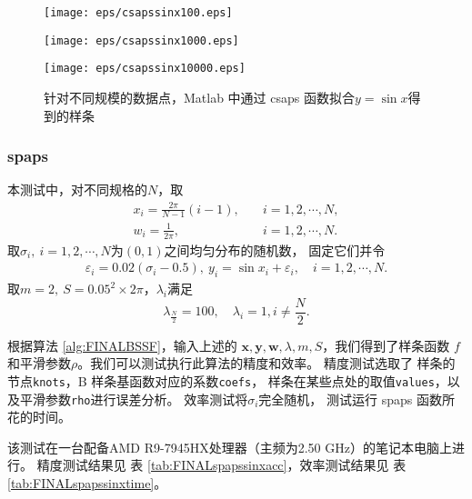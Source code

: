 \begin{figure}[h]  
  \centering   
  \begin{minipage}{0.3\textwidth}  
    \centering  
    \texttt{[image: eps/csapssinx100.eps]}  
    \caption*{$N=100$}  
  \end{minipage}  
  \hfill  
  \begin{minipage}{0.3\textwidth}  
    \centering  
    \texttt{[image: eps/csapssinx1000.eps]}  
    \caption*{$N=1000$}  
  \end{minipage}
  \hfill  
  \begin{minipage}{0.3\textwidth}  
    \centering  
    \texttt{[image: eps/csapssinx10000.eps]}  
    \caption*{$N=10000$}  
  \end{minipage}   
  \caption{针对不同规模的数据点，Matlab 中通过 csaps 函数拟合$y=\sin x$得到的样条}
  \label{fig:FINALcsapssinx}  
\end{figure}

\subsubsection{spaps}
\label{subsubsec:spapssinx}
本测试中，对不同规格的$N$，取
\begin{align*}
  x_{i}=\frac{2\pi}{N-1} (i-1),
  \quad &i=1,2,\cdots,N,\\
  w_{i}=\frac{1}{2\pi},\quad &i=1,2,\cdots,N.
\end{align*}
取$\sigma_{i},\ i=1,2,\cdots,N$为$(0,1)$之间均匀分布的随机数，
固定它们并令
\begin{align*}
  \varepsilon_{i}=0.02(\sigma_{i}-0.5),\
  y_{i}=\sin x_{i}+\varepsilon_{i},\quad i=1,2,\cdots,N.
\end{align*}
取$m=2,\ S=0.05^{2}\times2\pi$，$\lambda_{i}$满足
\begin{displaymath}
  \lambda_{\frac{N}{2}}=100,\quad
  \lambda_{i}=1, i\neq \frac{N}{2}.
\end{displaymath}

根据算法 \ref{alg:FINALBSSF}，输入上述的
$\mathbf{x}, \mathbf{y}, \mathbf{w}, \lambda, m,S$，我们得到了样条函数
$f$和平滑参数$\rho$。我们可以测试执行此算法的精度和效率。
精度测试选取了
样条的节点\texttt{knots}，B 样条基函数对应的系数\texttt{coefs}，
样条在某些点处的取值\texttt{values}，以及平滑参数\texttt{rho}进行误差分析。
效率测试将$\sigma_{i}$完全随机，
测试运行 spaps 函数所花的时间。

该测试在一台配备AMD R9-7945HX处理器（主频为2.50 GHz）的笔记本电脑上进行。
精度测试结果见
表 \ref{tab:FINALspapssinxacc}，效率测试结果见
表 \ref{tab:FINALspapssinxtime}。

